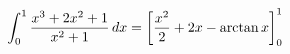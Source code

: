 \documentclass[preview]{standalone}
\begin{document}
\begin{align*}
\special{dvisvgm:raw <g id='unique000'>}\int_0^1\frac{x^3+2x^2+1}{x^2+1}\,dx=\left[\frac{x^2}{2}+2x-\arctan x\right]_0^1\special{dvisvgm:raw </g>}
\end{align*}
\end{document}

